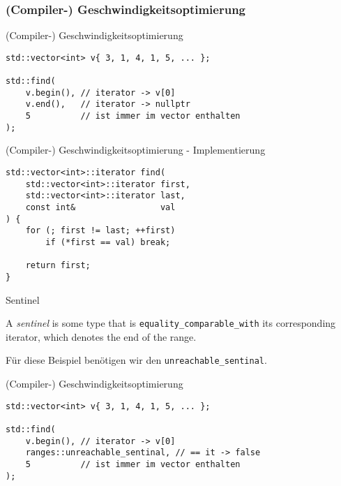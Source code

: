 \subsubsection{(Compiler-) Geschwindigkeitsoptimierung}

\begin{frame}[fragile]{(Compiler-) Geschwindigkeitsoptimierung}
    \begin{verbatim}
std::vector<int> v{ 3, 1, 4, 1, 5, ... };

std::find(
    v.begin(), // iterator -> v[0]
    v.end(),   // iterator -> nullptr
    5          // ist immer im vector enthalten
);
    \end{verbatim}
\end{frame}

\begin{frame}[fragile]{(Compiler-) Geschwindigkeitsoptimierung - Implementierung}
    \begin{verbatim}
std::vector<int>::iterator find(
    std::vector<int>::iterator first,
    std::vector<int>::iterator last,
    const int&                 val
) {
    for (; first != last; ++first)
        if (*first == val) break;
    
    return first;
}
    \end{verbatim}
\end{frame}

\begin{frame}{Sentinel}
    \begin{center}
        A \emph{sentinel} is some type that is \texttt{equality\_comparable\_with} its corresponding iterator, which denotes the end of the range.

        \vspace{2.5em}

        Für diese Beispiel benötigen wir den \texttt{unreachable\_sentinal}.
    \end{center}
\end{frame}

\begin{frame}[fragile]{(Compiler-) Geschwindigkeitsoptimierung}
    \begin{verbatim}
std::vector<int> v{ 3, 1, 4, 1, 5, ... };

std::find(
    v.begin(), // iterator -> v[0]
    ranges::unreachable_sentinal, // == it -> false
    5          // ist immer im vector enthalten
);
    \end{verbatim}
\end{frame}

